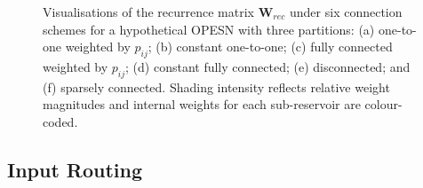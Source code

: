 \begin{figure}
\begin{subfigure}[t]{0.45\textwidth}
    \end{subfigure}

    \caption{Visualisations of the recurrence matrix $\mathbf{W}_{rec}$ under six connection schemes for a hypothetical OPESN with three partitions: (a) one-to-one weighted by $p_{ij}$; (b) constant one-to-one; (c) fully connected weighted by $p_{ij}$; (d) constant fully connected; (e) disconnected; and (f) sparsely connected. Shading intensity reflects relative weight magnitudes and internal weights for each sub-reservoir are colour-coded.}
    \label{fig:W_rec_viz}
\end{figure}

\subsection{Input Routing}

